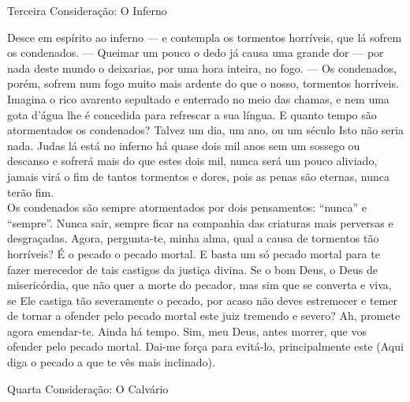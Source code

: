 \documentclass{book}
\begin{document}
\begin{center}
    \textcolor{VioletRed2}{Terceira Consideração: O Inferno}
\end{center}
\begin{flushleft}
    Desce em espírito ao inferno --- e contempla os tormentos horríveis, que lá sofrem os condenados. --- Queimar um pouco o dedo já causa uma grande dor --- por nada deste mundo o deixarias, por uma hora inteira, no fogo. --- Os condenados, porém, sofrem num fogo muito mais ardente do que o nosso, tormentos horríveis. Imagina o rico avarento sepultado e enterrado no meio das chamas, e nem uma gota d'água lhe é concedida para refrescar a sua língua. E quanto tempo são atormentados os condenados? Talvez um dia, um ano, ou um século Isto não seria nada. Judas lá está no inferno há quase dois mil anos sem um sossego ou descanso e sofrerá mais do que estes dois mil, nunca será um pouco aliviado, jamais virá o fim de tantos tormentos e dores, pois as penas são eternas, nunca terão fim.
    \vspace{.2cm} \\
    Os condenados são sempre atormentados por dois pensamentos: ``nunca'' e ``sempre''. Nunca sair, sempre ficar na companhia das criaturas mais perversas e desgraçadas. Agora, pergunta-te, minha alma, qual a causa de tormentos tão horríveis? É o pecado o pecado mortal. E basta um só pecado mortal para te fazer merecedor de tais castigos da justiça divina. Se o bom Deus, o Deus de misericórdia, que não quer a morte do pecador, mas sim que se converta e viva, se Ele castiga tão severamente o pecado, por acaso não deves estremecer e temer de tornar a ofender pelo pecado mortal este juiz tremendo e severo? Ah, promete agora emendar-te. Ainda há tempo. Sim, meu Deus, antes morrer, que vos ofender pelo pecado mortal. Dai-me força para evitá-lo, principalmente este \textcolor{VioletRed2}{(Aqui diga o pecado a que te vês mais inclinado)}.
\end{flushleft}
\newpage
\begin{center}
    \textcolor{VioletRed2}{Quarta Consideração: O Calvário}
\end{center}
\end{document}
